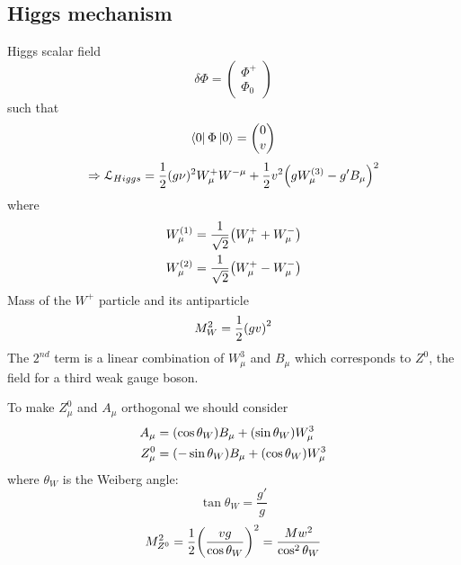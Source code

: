 \documentclass[../main/main.tex]{subfiles}
\begin{document}
\subsection{Higgs mechanism}
Higgs scalar field
\begin{equation}
  \delta \Phi = \begin{pmatrix}
  \Phi ^+ \\
  \Phi _0
  \end{pmatrix}
\end{equation}
such that
\begin{equation}
  \bra{0} \Phi \ket{0} = \begin{pmatrix}
  0 \\
  v
  \end{pmatrix}
\end{equation}
\begin{equation}
  \Rightarrow \mathcal{L}_{Higgs} = \frac{1}{2} (g \nu )^2 W_ \mu ^+ W^{- \mu }
  + \frac{1}{2} v^2 \qty(g W _ \mu ^{(3)} - g' B _ \mu )^2
\end{equation}
where
\begin{subequations}
\begin{align}
  W_ \mu ^{(1)} &=  \frac{1}{\sqrt{2} } \qty(W_ \mu ^+ + W _ \mu ^-) \\
  W_ \mu ^{(2)} &=  \frac{1}{\sqrt{2} } \qty(W_ \mu ^+ - W _ \mu ^-)
\end{align}
\end{subequations}
Mass of the \( W^+ \) particle and its antiparticle
\begin{equation}
  M_W^2 = \frac{1}{2} \qty(g v)^2
\end{equation}
The \( 2^{nd} \) term is a linear combination of \( W_ \mu ^3 \) and \( B_ \mu  \) which corresponds to \( Z^0 \), the field for a third weak gauge boson.

To make \( Z_ \mu ^0 \) and \( A _ \mu  \) orthogonal we should consider
\begin{subequations}
\begin{align}
  A_ \mu  &=  \qty(\cos \theta _W) B _ \mu  + \qty(\sin \theta _W ) W_ \mu ^3 \\
  Z_ \mu ^0 & = \qty(- \sin \theta _W ) B _ \mu + \qty(\cos \theta _W ) W_ \mu ^3
\end{align}
\end{subequations}
where \( \theta _W \) is the Weiberg angle:
\begin{equation}
  \tan \theta _W = \frac{g'}{g}
\end{equation}
\begin{equation}
  M_ {Z^0}^2 = \frac{1}{2} \qty(\frac{vg}{\cos \theta _W})^2 = \frac{M w^2}{\cos^2 \theta _W} 
\end{equation}
\end{document}
